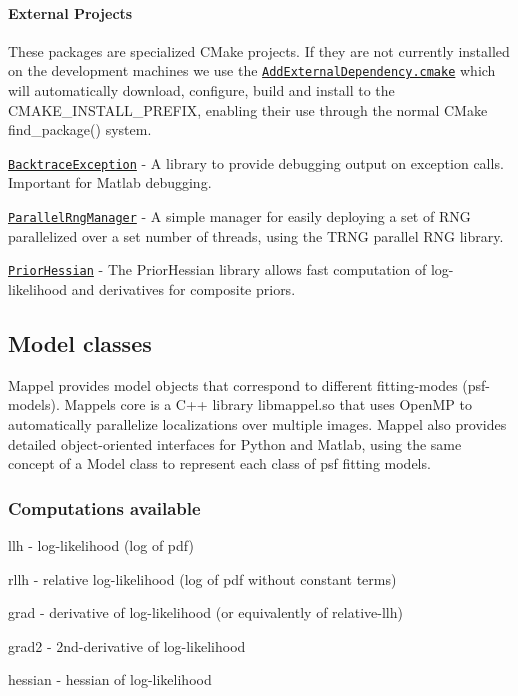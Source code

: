 \paragraph*{External Projects}

These packages are specialized C\+Make projects. If they are not currently installed on the development machines we use the \href{https://github.com/markjolah/UncommonCMakeModules/blob/master/AddExternalDependency.cmake}{\tt Add\+External\+Dependency.\+cmake} which will automatically download, configure, build and install to the {\ttfamily C\+M\+A\+K\+E\+\_\+\+I\+N\+S\+T\+A\+L\+L\+\_\+\+P\+R\+E\+F\+IX}, enabling their use through the normal C\+Make {\ttfamily find\+\_\+package()} system.


\begin{DoxyItemize}
\item \href{https://markjolah.github.iom/BacktraceException}{\tt Backtrace\+Exception} -\/ A library to provide debugging output on exception calls. Important for Matlab debugging.
\item \href{https://markjolah.github.io/ParallelRngManager}{\tt Parallel\+Rng\+Manager} -\/ A simple manager for easily deploying a set of R\+NG parallelized over a set number of threads, using the T\+R\+NG parallel R\+NG library.
\item \href{https:///markjolah.github.io/ParallelRngManager}{\tt Prior\+Hessian} -\/ The Prior\+Hessian library allows fast computation of log-\/likelihood and derivatives for composite priors.
\end{DoxyItemize}

\subsection*{Model classes}

Mappel provides model objects that correspond to different fitting-\/modes (psf-\/models). Mappel\textquotesingle{}s core is a C++ library {\ttfamily libmappel.\+so} that uses Open\+MP to automatically parallelize localizations over multiple images. Mappel also provides detailed object-\/oriented interfaces for Python and Matlab, using the same concept of a Model class to represent each class of psf fitting models.

\subsubsection*{Computations available}


\begin{DoxyItemize}
\item {\ttfamily llh} -\/ log-\/likelihood (log of pdf)
\item {\ttfamily rllh} -\/ relative log-\/likelihood (log of pdf without constant terms)
\item {\ttfamily grad} -\/ derivative of log-\/likelihood (or equivalently of relative-\/llh)
\item {\ttfamily grad2} -\/ 2nd-\/derivative of log-\/likelihood
\item {\ttfamily hessian} -\/ hessian of log-\/likelihood
\end{DoxyItemize}

